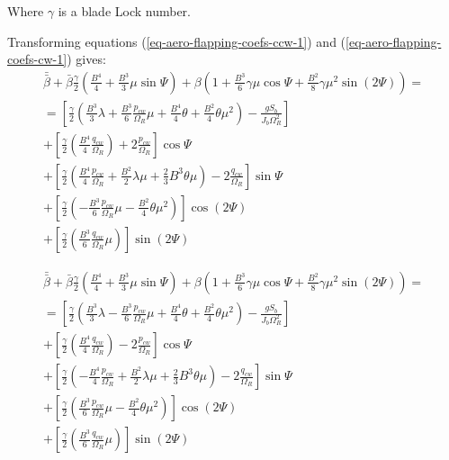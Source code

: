 Where $\gamma$ is a blade Lock number.

Transforming equations (\ref{eq-aero-flapping-coefs-ccw-1}) and (\ref{eq-aero-flapping-coefs-cw-1}) gives:
\begin{multline}
  \label{eq-aero-flapping-coefs-ccw-2}
  \bar{\bar \beta} + \bar \beta \frac{\gamma}{2}
  \left( \frac{B^4}{4} + \frac{B^3}{3} \mu \sin \Psi \right)
  + \beta \left(
    1 + \frac{B^3}{6} \gamma \mu \cos \Psi
    + \frac{B^2}{8} \gamma \mu^2 \sin \left( 2 \Psi \right)
  \right)
  = \\ =
  \left[
    \frac{\gamma}{2}
    \left(
        \frac{B^3}{3} \lambda
      + \frac{B^3}{6} \frac{p_{cw}}{\Omega_R} \mu
      + \frac{B^4}{4} \theta
      + \frac{B^2}{4} \theta \mu^2
    \right)
    - \frac{ g S_b }{ J_b \Omega_R^2 }
  \right]
  \\
  + \left[
    \frac{\gamma}{2}
    \left( \frac{B^4}{4} \frac{q_{cw}}{\Omega_R} \right)
    + 2 \frac{p_{cw}}{\Omega_R}
  \right] \cos \Psi
  \\
  + \left[
    \frac{\gamma}{2}
    \left(
        \frac{B^4}{4} \frac{p_{cw}}{\Omega_R}
      + \frac{B^2}{2} \lambda \mu
      + \frac{2}{3} B^3 \theta \mu
    \right)
    - 2 \frac{q_{cw}}{\Omega_R}
  \right] \sin \Psi
  \\
  + \left[
    \frac{\gamma}{2}
    \left(
      - \frac{B^3}{6} \frac{p_{cw}}{\Omega_R} \mu
      - \frac{B^2}{4} \theta \mu^2
    \right)
  \right] \cos \left( 2 \Psi \right)
  \\
  + \left[
    \frac{\gamma}{2}
    \left( \frac{B^3}{6} \frac{q_{cw}}{\Omega_R} \mu \right)
  \right] \sin \left( 2 \Psi \right)
\end{multline}

\vfill

\begin{multline}
  \label{eq-aero-flapping-coefs-cw-2}
  \bar{\bar \beta} + \bar \beta \frac{\gamma}{2}
  \left( \frac{B^4}{4} + \frac{B^3}{3} \mu \sin \Psi \right)
  + \beta \left(
    1 + \frac{B^3}{6} \gamma \mu \cos \Psi
    + \frac{B^2}{8} \gamma \mu^2 \sin \left( 2 \Psi \right)
  \right)
  = \\ =
  \left[
    \frac{\gamma}{2}
    \left(
        \frac{B^3}{3} \lambda
      - \frac{B^3}{6} \frac{p_{cw}}{\Omega_R} \mu
      + \frac{B^4}{4} \theta
      + \frac{B^2}{4} \theta \mu^2
    \right)
    - \frac{ g S_b }{ J_b \Omega_R^2 }
  \right]
  \\
  + \left[
    \frac{\gamma}{2}
    \left( \frac{B^4}{4} \frac{q_{cw}}{\Omega_R} \right)
    - 2 \frac{p_{cw}}{\Omega_R}
  \right] \cos \Psi
  \\
  + \left[
    \frac{\gamma}{2}
    \left(
      - \frac{B^4}{4} \frac{p_{cw}}{\Omega_R}
      + \frac{B^2}{2} \lambda \mu
      + \frac{2}{3} B^3 \theta \mu
    \right)
    - 2 \frac{q_{cw}}{\Omega_R}
  \right] \sin \Psi
  \\
  + \left[
    \frac{\gamma}{2}
    \left(
        \frac{B^3}{6} \frac{p_{cw}}{\Omega_R} \mu
      - \frac{B^2}{4} \theta \mu^2
    \right)
  \right] \cos \left( 2 \Psi \right)
  \\
  + \left[
    \frac{\gamma}{2}
    \left( \frac{B^3}{6} \frac{q_{cw}}{\Omega_R} \mu \right)
  \right] \sin \left( 2 \Psi \right)
\end{multline}

